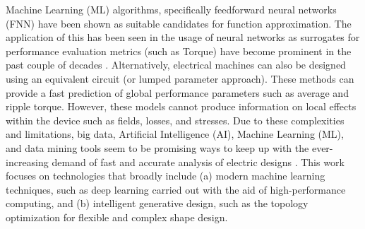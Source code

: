 Machine Learning (ML) algorithms, specifically feedforward neural networks (FNN) have been shown as suitable candidates for function approximation. The application of this has been seen in the usage of neural networks as surrogates for performance evaluation metrics (such as Torque) have become prominent in the past couple of decades \parencite{ghorbanian2018hpc, wlas2008neural}. Alternatively, electrical machines can also be designed using an equivalent circuit (or lumped parameter approach). These methods can provide a fast prediction of global performance parameters such as average and ripple torque. 
However, these models cannot produce information on local effects within the device such as fields, losses, and stresses. 
Due to these complexities and limitations, big data, Artificial Intelligence (AI), Machine Learning (ML), and data mining tools seem to be promising ways to keep up with the ever-increasing demand of fast and accurate analysis of electric designs \parencite{kisskalt2018towards, khan2020efficiency, salimi2018computer, ghorbanian2019hpc}.  This work focuses on technologies that broadly include (a) modern machine learning techniques, such as deep learning carried out with the aid of high-performance computing, and (b) intelligent generative design, such as the topology optimization for flexible and complex shape design.

